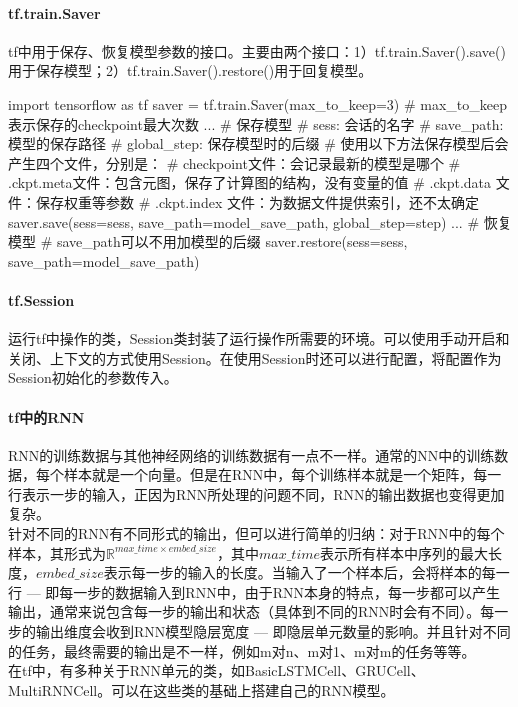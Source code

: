 \paragraph{tf.train.Saver}tf中用于保存、恢复模型参数的接口。主要由两个接口：1）tf.train.Saver().save()用于保存模型；2）tf.train.Saver().restore()用于回复模型。
\begin{python}
	import tensorflow as tf
	saver = tf.train.Saver(max\_to\_keep=3) # max\_to\_keep表示保存的checkpoint最大次数
	...
	# 保存模型
	# sess: 会话的名字
	# save\_path: 模型的保存路径
	# global\_step: 保存模型时的后缀
	# 使用以下方法保存模型后会产生四个文件，分别是：
	# checkpoint文件：会记录最新的模型是哪个
	# .ckpt.meta文件：包含元图，保存了计算图的结构，没有变量的值
	# .ckpt.data 文件：保存权重等参数
	# .ckpt.index 文件：为数据文件提供索引，{还不太确定}
	saver.save(sess=sess, save_path=model_save_path, global_step=step)
	...
	# 恢复模型
	# save_path可以不用加模型的后缀
	saver.restore(sess=sess, save_path=model_save_path)
\end{python}

\paragraph{tf.Session}运行tf中操作的类，Session类封装了运行操作所需要的环境。可以使用手动开启和关闭、上下文的方式使用Session。在使用Session时还可以进行配置，将配置作为Session初始化的参数传入。

\paragraph{tf中的RNN}RNN的训练数据与其他神经网络的训练数据有一点不一样。通常的NN中的训练数据，每个样本就是一个向量。但是在RNN中，每个训练样本就是一个矩阵，每一行表示一步的输入，正因为RNN所处理的问题不同，RNN的输出数据也变得更加复杂。\\
针对不同的RNN有不同形式的输出，但可以进行简单的归纳：对于RNN中的每个样本，其形式为$\mathbb{R}^{max\_time \times embed\_size}$，其中$max\_time$表示所有样本中序列的最大长度，$embed\_size$表示每一步的输入的长度。当输入了一个样本后，会将样本的每一行 --- 即每一步的数据输入到RNN中，由于RNN本身的特点，每一步都可以产生输出，通常来说包含每一步的输出和状态（具体到不同的RNN时会有不同）。每一步的输出维度会收到RNN模型隐层宽度 --- 即隐层单元数量的影响。并且针对不同的任务，最终需要的输出是不一样，例如m对n、m对1、m对m的任务等等。\\
在tf中，有多种关于RNN单元的类，如BasicLSTMCell、GRUCell、MultiRNNCell。可以在这些类的基础上搭建自己的RNN模型。

